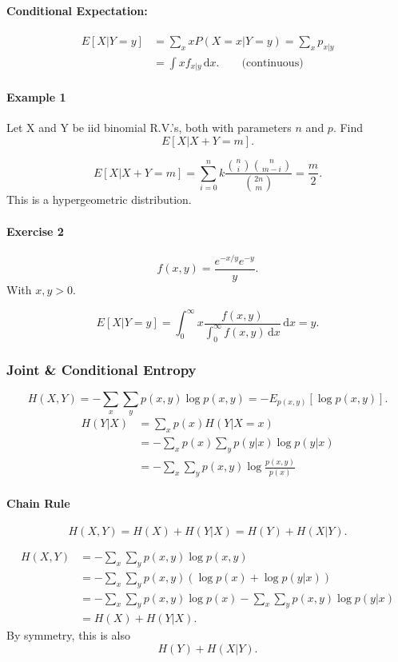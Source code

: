\documentclass[12pt]{article}
\newcommand{\diffn}[1]{\,\mathrm{d}{#1}}
\begin{document}
\paragraph{Conditional Expectation:}
\begin{align*}E[X|Y=y]&=\sum_x xP(X=x|Y=y)=\sum_x p_{x|y} \\
&=\int xf_{x|y}\diffn{x}. \qquad \text{(continuous)}\end{align*}

\paragraph{Example 1}
Let X and Y be iid binomial R.V.'s, both with parameters $n$ and $p.$
Find
\[E[X|X+Y=m].\]


\[E[X|X+Y=m]=\sum_{i=0}^n k\frac{\binom{n}{i}\binom{n}{m-i}}{\binom{2n}{m}}=\frac{m}{2}.\]
This is a hypergeometric distribution.
\paragraph{Exercise 2}
\[f(x,y)=\frac{e^{-x/y}e^{-y}}{y}.\]
With $x,y>0.$

\[E[X|Y=y]=\int_0^\infty x\frac{f(x,y)}{\int_0^\infty f(x,y)\diffn{x}}\diffn{x}=y.\]

\subsubsection{Joint \& Conditional Entropy}
\[H(X,Y) = -\sum_x \sum_y p(x,y) \log p(x,y) = -E_{p(x,y)}[\log p(x,y)]. \]
\begin{align*}H(Y|X) &= \sum_x p(x) H(Y|X=x) \\ 
&= -\sum_x p(x) \sum_y p(y|x) \log p(y|x) \\
&= -\sum_x \sum_y p(x,y) \log \frac{p(x,y)}{p(x)}\end{align*}


\paragraph{Chain Rule}
\[H(X,Y)=H(X)+H(Y|X)=H(Y)+H(X|Y).\]

\begin{align*}H(X,Y)&=-\sum_x\sum_y p(x,y)\log p(x,y)\\&=-\sum_x\sum_y p(x,y)(\log p(x)+\log p(y|x))\\&=-\sum_x\sum_y p(x,y)\log p(x)-\sum_x\sum_y p(x,y)\log p(y|x)\\&=H(X)+H(Y|X).\end{align*}
By symmetry, this is also
\[H(Y)+H(X|Y).\]
\end{document}
